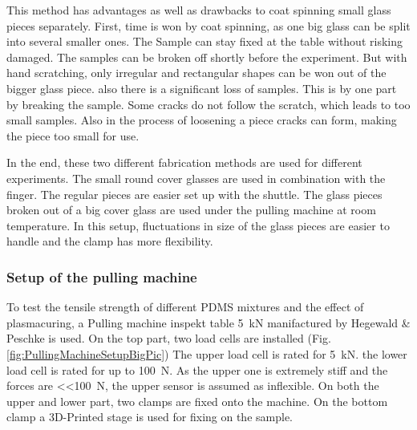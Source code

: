 This method has advantages as well as drawbacks to coat spinning small glass pieces separately. First, time is won by coat spinning, as one big glass can be split into several smaller ones. The Sample can stay fixed at the table without risking damaged. The samples can be broken off shortly before the experiment. But with hand scratching, only irregular and rectangular shapes can be won out of the bigger glass piece. also there is a significant loss of samples. This is by one part by breaking the sample. Some cracks do not follow the scratch, which leads to too small samples. Also in the process of loosening a piece cracks can form, making the piece too small for use.

In the end, these two different fabrication methods are used for different experiments. The small round cover glasses are used in combination with the finger. The regular pieces are easier set up with the shuttle. The glass pieces broken out of a big cover glass are used under the pulling machine at room temperature. In this setup, fluctuations in size of the glass pieces are easier to handle and the clamp has more flexibility.

\subsubsection{Setup of the pulling machine}

To test the tensile strength of different PDMS mixtures and the effect of plasmacuring, a Pulling machine inspekt table \SI{5}{\kilo\newton} manifactured by Hegewald \& Peschke is used. On the top part, two load cells are installed (Fig. \ref{fig:PullingMachineSetupBigPic}) The upper load cell is rated for \SI{5}{\kilo\newton}. the lower load cell is rated for up to \SI{100}{\newton}. As the upper one is extremely stiff and the forces are \SI{<<100}{\newton}, the upper sensor is assumed as inflexible. On both the upper and lower part, two clamps are fixed onto the machine. On the bottom clamp a 3D-Printed stage is used for fixing on the sample.

